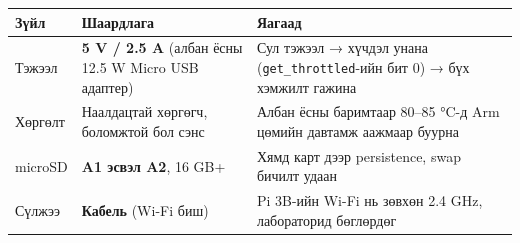 \begingroup\scriptsize\begin{longtable}[]{@{}lll@{}}
\toprule
\begin{minipage}[b]{0.30\columnwidth}\raggedright
Зүйл\strut
\end{minipage} & \begin{minipage}[b]{0.30\columnwidth}\raggedright
Шаардлага\strut
\end{minipage} & \begin{minipage}[b]{0.30\columnwidth}\raggedright
Яагаад\strut
\end{minipage}\tabularnewline
\midrule
\endhead
\begin{minipage}[t]{0.30\columnwidth}\raggedright
Тэжээл\strut
\end{minipage} & \begin{minipage}[t]{0.30\columnwidth}\raggedright
\textbf{5 V / 2.5 A} (албан ёсны 12.5 W Micro USB адаптер)\strut
\end{minipage} & \begin{minipage}[t]{0.30\columnwidth}\raggedright
Сул тэжээл → хүчдэл унана (\texttt{get\_throttled}-ийн бит 0) → бүх хэмжилт гажина\strut
\end{minipage}\tabularnewline
\begin{minipage}[t]{0.30\columnwidth}\raggedright
Хөргөлт\strut
\end{minipage} & \begin{minipage}[t]{0.30\columnwidth}\raggedright
Наалдацтай хөргөгч, боломжтой бол сэнс\strut
\end{minipage} & \begin{minipage}[t]{0.30\columnwidth}\raggedright
Албан ёсны баримтаар 80--85 °C-д Arm цөмийн давтамж аажмаар буурна\strut
\end{minipage}\tabularnewline
\begin{minipage}[t]{0.30\columnwidth}\raggedright
microSD\strut
\end{minipage} & \begin{minipage}[t]{0.30\columnwidth}\raggedright
\textbf{A1 эсвэл A2}, 16 GB+\strut
\end{minipage} & \begin{minipage}[t]{0.30\columnwidth}\raggedright
Хямд карт дээр persistence, swap бичилт удаан\strut
\end{minipage}\tabularnewline
\begin{minipage}[t]{0.30\columnwidth}\raggedright
Сүлжээ\strut
\end{minipage} & \begin{minipage}[t]{0.30\columnwidth}\raggedright
\textbf{Кабель} (Wi-Fi биш)\strut
\end{minipage} & \begin{minipage}[t]{0.30\columnwidth}\raggedright
Pi 3B-ийн Wi-Fi нь зөвхөн 2.4 GHz, лабораторид бөглөрдөг\strut
\end{minipage}\tabularnewline
\bottomrule
\end{longtable}\endgroup

